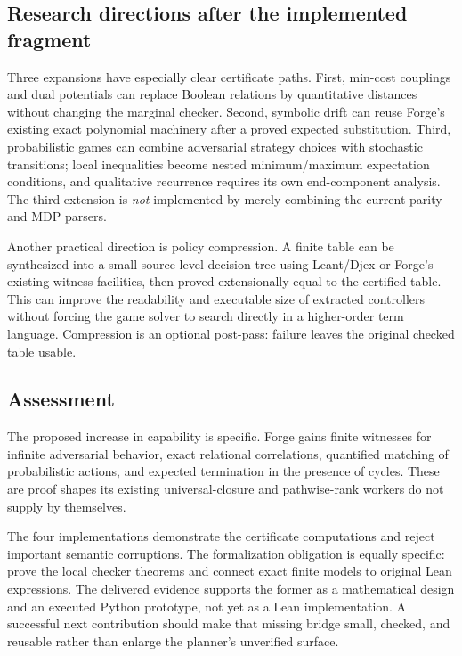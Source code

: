 \subsection{Research directions after the implemented fragment}

Three expansions have especially clear certificate paths. First, min-cost
couplings and dual potentials can replace Boolean relations by quantitative
distances without changing the marginal checker. Second, symbolic drift can
reuse Forge's existing exact polynomial machinery after a proved expected
substitution. Third, probabilistic games can combine adversarial strategy
choices with stochastic transitions; local inequalities become nested
minimum/maximum expectation conditions, and qualitative recurrence requires
its own end-component analysis. The third extension is \emph{not} implemented
by merely combining the current parity and MDP parsers.

Another practical direction is policy compression. A finite table can be
synthesized into a small source-level decision tree using Leant/Djex or Forge's
existing witness facilities, then proved extensionally equal to the certified
table. This can improve the readability and executable size of extracted
controllers without forcing the game solver to search directly in a
higher-order term language. Compression is an optional post-pass: failure
leaves the original checked table usable.

\subsection{Assessment}

The proposed increase in capability is specific. Forge gains finite witnesses
for infinite adversarial behavior, exact relational correlations, quantified
matching of probabilistic actions, and expected termination in the presence of
cycles. These are proof shapes its existing universal-closure and pathwise-rank
workers do not supply by themselves.

The four implementations demonstrate the certificate computations and reject
important semantic corruptions. The formalization obligation is equally
specific: prove the local checker theorems and connect exact finite models to
original Lean expressions. The delivered evidence supports the former as a
mathematical design and an executed Python prototype, not yet as a Lean
implementation. A successful next contribution should make that missing bridge
small, checked, and reusable rather than enlarge the planner's unverified
surface.
